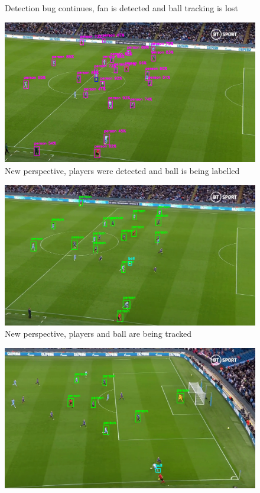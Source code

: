 \documentclass[
    11pt,
    oneside
]{report}
\begin{document}
\begin{appendices}
\begin{figure}[H]
    \caption{Detection bug continues, fan is detected and ball tracking is lost}
    \label{img:12}
\end{figure}
\begin{figure}[H]
    \includegraphics[keepaspectratio, width=\columnwidth]{Screenshot_2022-03-03_23-09-45.png}
    \caption{New perspective, players were detected and ball is being labelled}
    \label{img:13}
\end{figure}
\begin{figure}[H]
    \includegraphics[keepaspectratio, width=\columnwidth]{Screenshot_2022-03-03_23-10-58.png}
    \caption{New perspective, players and ball are being tracked}
    \label{img:14}
\end{figure}
\begin{figure}[H]
    \includegraphics[keepaspectratio, width=\columnwidth]{Screenshot_2022-03-03_23-12-29.png}

\end{figure}
\end{appendices}
\end{document}

